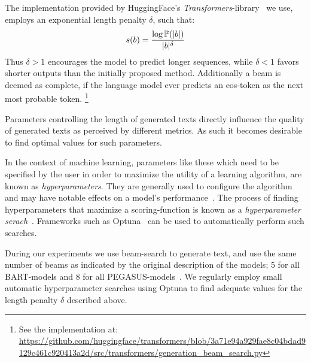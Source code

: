 The implementation provided by HuggingFace's \emph{Transformers}-library~\parencite{huggingface_transformers} we use,
employs an exponential length penalty \(\delta\), such that:
\begin{equation}
s(b) =\frac{\log \mathbb{P}(|b|)}{|b|^\delta}
\end{equation}
Thus \(\delta > 1\) encourages the model to predict longer sequences,
while \(\delta < 1\) favors shorter outputs than the initially proposed method.
Additionally a beam is deemed as complete, if the language model ever predicts an \ac{eos}-token as the next most probable token.%
\footnote{See the implementation at: \url{https://github.com/huggingface/transformers/blob/3a71e94a929fae8c04bdad9129c461c920413a2d/src/transformers/generation_beam_search.py}}

Parameters controlling the length of generated texts
directly influence the quality of generated texts as perceived by different metrics.
As such it becomes desirable to find optimal values for such parameters.

In the context of machine learning, parameters like these
which need to be specified by the user in order to maximize the utility of a learning algorithm,
are known as \emph{hyperparameters}.
They are generally used to configure the algorithm and may have notable effects on a model's performance~\parencite[1]{hyperparameter_search}.
The process of finding hyperparameters that maximize a scoring-function is known as a \emph{hyperparameter serach}~\parencite[1]{hyperparameter_search}.
Frameworks such as Optuna~\parencite{optuna} can be used to automatically perform such searches.

During our experiments we use beam-search to generate text,
and use the same number of beams as indicated by the original description of the models;
5 for all BART-models and 8 for all PEGASUS-models~\parencites{bart}{pegasus}.
We regularly employ small automatic hyperparameter searches using Optuna
to find adequate values for the length penalty \(\delta\) described above.
